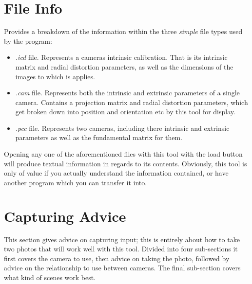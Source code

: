 \documentclass[10pt,a4paper,twoside]{article}
\begin{document}
\section{File Info}
Provides a breakdown of the information within the three \emph{simple} file types used  by the program:
\begin{itemize}
\item \emph{.icd} file. Represents a cameras intrinsic calibration. That is its intrinsic matrix and radial distortion parameters, as well as the dimensions of the images to which is applies.

\item \emph{.cam} file. Represents both the intrinsic and extrinsic parameters of a single camera. Contains a projection matrix and radial distortion parameters, which get broken down into position and orientation etc by this tool for display.

\item \emph{.pcc} file. Represents two cameras, including there intrinsic and extrinsic parameters as well as the fundamental matrix for them.
\end{itemize}
Opening any one of the aforementioned files with this tool with the load button will produce textual information in regards to its contents. Obviously, this tool is only of value if you actually understand the information contained, or have another program which you can transfer it into.



\section{Capturing Advice}
\label{capture_advice}
This section gives advice on capturing input; this is entirely about how to take two photos that will work well with this tool.
Divided into four sub-sections it first covers the camera to use, then advice on taking the photo, followed by advice on the relationship to use between cameras. The final sub-section covers what kind of scenes work best.
\end{document}
